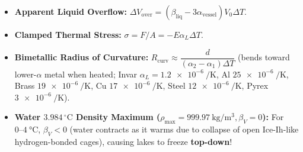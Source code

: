 \documentclass[10pt,twoside,openany,letterpaper]{book}
\begin{document}
\begin{quicksheet}
\begin{twocol}[0.49]
\begin{formulacard}
\begin{itemize}
  \item \textbf{Apparent Liquid Overflow:} $\Delta V_{\mathrm{over}} = (\beta_{\mathrm{liq}} - 3\alpha_{\mathrm{vessel}})V_0\Delta T$.
  \item \textbf{Clamped Thermal Stress:} $\sigma = F/A = -E\alpha_L\Delta T$.
  \item \textbf{Bimetallic Radius of Curvature:} $R_{\mathrm{curv}} \approx \dfrac{d}{(\alpha_2 - \alpha_1)\Delta T}$ (bends toward lower-$\alpha$ metal when heated; Invar $\alpha_L = \SI{1.2e-6}{\per\kelvin}$, Al $\SI{25e-6}{\per\kelvin}$, Brass $\SI{19e-6}{\per\kelvin}$, Cu $\SI{17e-6}{\per\kelvin}$, Steel $\SI{12e-6}{\per\kelvin}$, Pyrex $\SI{3e-6}{\per\kelvin}$).
  \item \textbf{Water $3.984\,^\circ\mathrm{C}$ Density Maximum ($\rho_{\max} = \SI{999.97}{\kilogram\per\cubic\meter}, \beta_V = 0$):} For $0\text{--}\SI{4}{\celsius}$, $\beta_V < 0$ (water contracts as it warms due to collapse of open Ice-Ih-like hydrogen-bonded cages), causing lakes to freeze \textbf{top-down}!
\end{itemize}
\end{formulacard}
\end{twocol}


\end{quicksheet}
\end{document}
